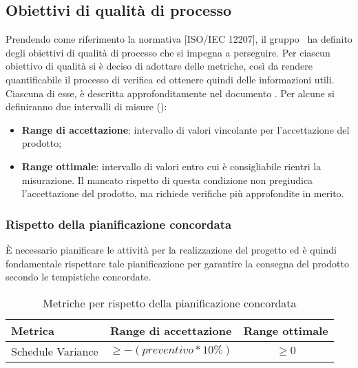 \documentclass[../PianoDiQualifica.tex]{subfiles}
\begin{document}
		\subsection{Obiettivi di qualità di processo}\label{sez:obiettiviQualitaProcesso}
			Prendendo come riferimento la normativa [ISO/IEC 12207], il gruppo \kaleidoscode\ ha
			definito degli obiettivi di qualità di processo che si impegna a perseguire.
			Per ciascun obiettivo di qualità si è deciso di adottare delle metriche, così da rendere
			quantificabile il processo di verifica ed ottenere quindi delle informazioni utili.\\
			Ciascuna di esse, è descritta approfonditamente nel documento \normediprogetto.
			Per alcune si definiranno due intervalli di misure ():
			\begin{itemize}
				\item \textbf{Range di accettazione}: intervallo di valori
				vincolante per l'accettazione del prodotto;
				\item \textbf{Range ottimale}: intervallo di valori entro cui è
				consigliabile rientri la misurazione. Il mancato rispetto di
				questa condizione non pregiudica l'accettazione del prodotto, ma
				richiede verifiche più approfondite in merito.
			\end{itemize}
			\subsubsection{Rispetto della pianificazione concordata}
				È necessario pianificare le attività per la realizzazione del progetto ed è
				quindi fondamentale rispettare tale pianificazione per garantire la consegna
				del prodotto secondo le tempistiche concordate.\\
				\normalsize
				\begin{table}[H]
				\center
					\begin{tabular}{|p{6.5cm}|c|c|}
						\hline
						\rowcolor{blue!30}\textbf{Metrica} & \textbf{Range di accettazione} & \textbf{Range ottimale} \\ \hline
						Schedule Variance & $\geq -(preventivo*10\%)$ & $\geq 0$ \\ \hline
					\end{tabular}
					\caption{Metriche per rispetto della pianificazione concordata}
				\end{table}
\end{document}
